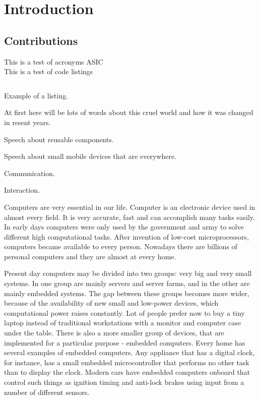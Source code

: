 \newpage
\section{Introduction}

\subsection{Contributions}



This is a test of acronyms  \gls{ASIC} \\

This is a test of code listings
\begin{listing}[H]
	\inputminted[linenos=true,
	fistline=32,
	firstnumber=32,
	lastline=60]{java}{../source/CoffeeMachineViaBlueTooth.java}
	\caption{Example of a listing.}
	\label{lst:example}
\end{listing}


At first here will be lots of words about this cruel world and how it was
changed in resent years.

Speech about reusable components.

Speech about small mobile devices that are everywhere.



Communication.

Interaction.





Computers are very essential in our life. Computer is an electronic device
used in almost every field. It is very accurate, fast and can accomplish
many tasks easily. In early days computers were only used by the government
and army to solve different high computational tasks. After invention of
low-cost microprocessors, computers became available to every person. Nowadays  
there are billions of personal computers and they are almost at every home.

Present day computers may be divided into two groups: very big and very small systems. In one group are mainly servers and
server farms, and in the other are mainly embedded systems. 
The gap between these groups becomes more wider, because of the availability of new small and low-power devices, which computational power raises constantly.
Lot of people prefer now to buy a tiny laptop instead of traditional workstations with a monitor and computer case under the table.
There is also a more smaller group of devices, that are implemented for a particular purpose - embedded computers.  
Every home has several examples of embedded computers.
Any appliance that has a digital clock, for instance, has a small embedded microcontroller that performs no other task than to display the clock.
Modern cars have embedded computers onboard that control such things as ignition timing and anti-lock brakes using input from a number of different sensors.


